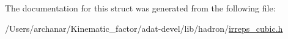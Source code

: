 The documentation for this struct was generated from the following file\+:\begin{DoxyCompactItemize}
\item 
/\+Users/archanar/\+Kinematic\+\_\+factor/adat-\/devel/lib/hadron/\mbox{\hyperlink{adat-devel_2lib_2hadron_2irreps__cubic_8h}{irreps\+\_\+cubic.\+h}}\end{DoxyCompactItemize}
